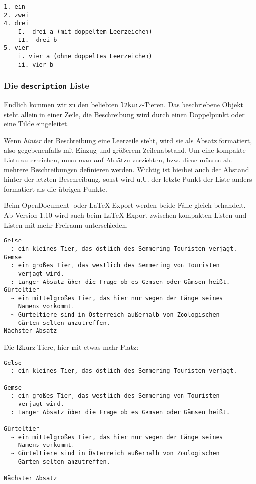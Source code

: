 \documentclass[11pt,ngerman,a4paper]{article}
\begin{document}
\begin{verbatim}
1. ein
2. zwei
4. drei
    I.  drei a (mit doppeltem Leerzeichen)
    II.  drei b
5. vier
    i. vier a (ohne doppeltes Leerzeichen)
    ii. vier b
\end{verbatim}

\subsubsection{Die \texttt{description} Liste}

Endlich kommen wir zu den beliebten \texttt{l2kurz}-Tieren. Das
beschriebene Objekt steht allein in einer Zeile, die Beschreibung wird
durch einen Doppelpunkt oder eine Tilde eingeleitet.

Wenn \emph{hinter} der Beschreibung eine Leerzeile steht, wird sie als
Absatz formatiert, also gegebenenfalls mit Einzug und größerem
Zeilenabstand. Um eine kompakte Liste zu erreichen, muss man auf Absätze
verzichten, bzw. diese müssen als mehrere Beschreibungen definieren
werden. Wichtig ist hierbei auch der Abstand hinter der letzten
Beschreibung, sonst wird u.U. der letzte Punkt der Liste anders
formatiert als die übrigen Punkte.

Beim OpenDocument- oder LaTeX-Export werden beide Fälle gleich
behandelt. Ab Version 1.10 wird auch beim LaTeX-Export zwischen
kompakten Listen und Listen mit mehr Freiraum unterschieden.

\begin{verbatim}
Gelse
  : ein kleines Tier, das östlich des Semmering Touristen verjagt.
Gemse
  : ein großes Tier, das westlich des Semmering von Touristen 
    verjagt wird.
  : Langer Absatz über die Frage ob es Gemsen oder Gämsen heißt.
Gürteltier
  ~ ein mittelgroßes Tier, das hier nur wegen der Länge seines 
    Namens vorkommt.
  ~ Gürteltiere sind in Österreich außerhalb von Zoologischen 
    Gärten selten anzutreffen.
Nächster Absatz
\end{verbatim}

Die l2kurz Tiere, hier mit etwas mehr Platz:

\begin{verbatim}
Gelse
  : ein kleines Tier, das östlich des Semmering Touristen verjagt.

Gemse
  : ein großes Tier, das westlich des Semmering von Touristen 
    verjagt wird.
  : Langer Absatz über die Frage ob es Gemsen oder Gämsen heißt.

Gürteltier
  ~ ein mittelgroßes Tier, das hier nur wegen der Länge seines 
    Namens vorkommt.
  ~ Gürteltiere sind in Österreich außerhalb von Zoologischen 
    Gärten selten anzutreffen.

Nächster Absatz
\end{verbatim}
\end{document}
